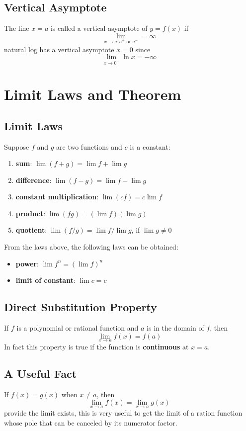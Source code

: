 \documentclass[10pt,a4paper,oneside]{article}
\begin{document}
\subsection{Vertical Asymptote}
The line $x = a$ is called a vertical asymptote of $y = f(x)$ if
\[
\lim_{x \rightarrow a, a^{+} \text{ or } a^{-}} = \infty
\]
natural log has a vertical asymptote $x = 0$ since
\[
\lim_{x \rightarrow 0^{+}} \ln x = - \infty
\]

\section{Limit Laws and Theorem}

\subsection{Limit Laws}
Suppose $f$ and $g$ are two functions and $c$ is a constant:
\begin{enumerate}
	\item \textbf{sum}: $\lim (f+g) = \lim  f + \lim g$
	\item \textbf{difference}: $\lim (f-g) = \lim  f - \lim g$
	\item \textbf{constant multiplication}: $\lim (cf) = c \lim  f$
	\item \textbf{product}: $\lim (fg) = (\lim  f)  (\lim g)$
	\item \textbf{quotient}: $\lim (f/g) = \lim  f / \lim g$, if $\lim g \neq 0$
\end{enumerate}
From the laws above, the following laws can be obtained:
\begin{itemize}
	\item \textbf{power}: $\lim f^n = (\lim  f)^n$
	\item \textbf{limit of constant}: $\lim c = c$
\end{itemize}

\subsection{Direct Substitution Property}
If $f$ is a polynomial or rational function and $a$ is in the domain of $f$, then
\[
\lim_{x \rightarrow a} f(x) = f(a)
\]
In fact this property is true if the function is \textbf{continuous} at $x=a$.

\subsection{A Useful Fact}
If $f(x) = g(x)$ when $x \neq a$, then
\[
\lim_{x \rightarrow a} f(x) = \lim_{x \rightarrow a} g(x)
\]
provide the limit exists, this is very useful to get the limit of a ration function whose pole that can be canceled by its numerator factor.
\end{document}
